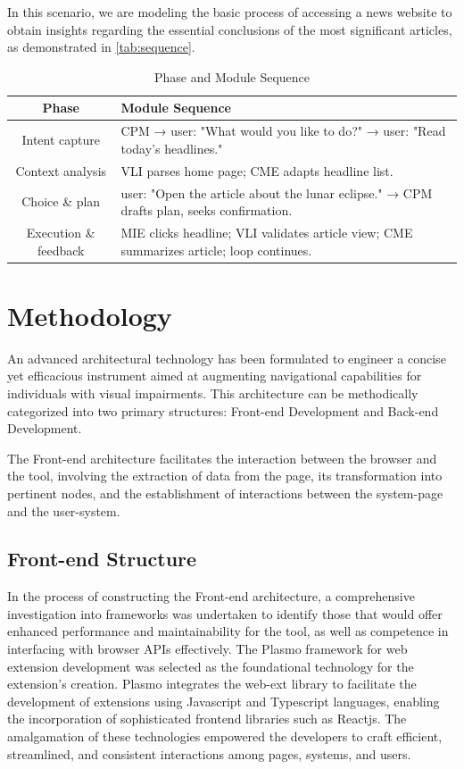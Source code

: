 \documentclass[conference]{IEEEtran}
\begin{document}
In this scenario, we are modeling the basic process of accessing a news website to obtain insights regarding the essential conclusions of the most significant articles, as demonstrated in \autoref{tab:sequence}.

\vfill
\begin{table}[ht]
\centering
\caption{Phase and Module Sequence}
\label{tab:sequence}
\footnotesize
\renewcommand{\arraystretch}{2}
\begin{tabular}{|c|p{5.5cm}|}
\hline
\textbf{Phase} & \textbf{Module Sequence} \\
\hline
Intent capture & CPM → user: "What would you like to do?" → user: "Read today's headlines." \\
\hline
Context analysis & VLI parses home page; CME adapts headline list. \\
\hline
Choice \& plan & user: "Open the article about the lunar eclipse." → CPM drafts plan, seeks confirmation. \\
\hline
Execution \& feedback & MIE clicks headline; VLI validates article view; CME summarizes article; loop continues. \\
\hline
\end{tabular}
\vspace{0.5cm}
\end{table}

\section{Methodology}

An advanced architectural technology has been formulated to engineer a concise yet efficacious instrument aimed at augmenting navigational capabilities for individuals with visual impairments. This architecture can be methodically categorized into two primary structures: Front-end Development and Back-end Development.

The Front-end architecture facilitates the interaction between the browser and the tool, involving the extraction of data from the page, its transformation into pertinent nodes, and the establishment of interactions between the system-page and the user-system.

\subsection{Front-end Structure}

In the process of constructing the Front-end architecture, a comprehensive investigation into frameworks was undertaken to identify those that would offer enhanced performance and maintainability for the tool, as well as competence in interfacing with browser APIs effectively. The Plasmo framework for web extension development was selected as the foundational technology for the extension's creation. Plasmo integrates the web-ext library to facilitate the development of extensions using Javascript and Typescript languages, enabling the incorporation of sophisticated frontend libraries such as Reactjs. The amalgamation of these technologies empowered the developers to craft efficient, streamlined, and consistent interactions among pages, systems, and users.
\end{document}
